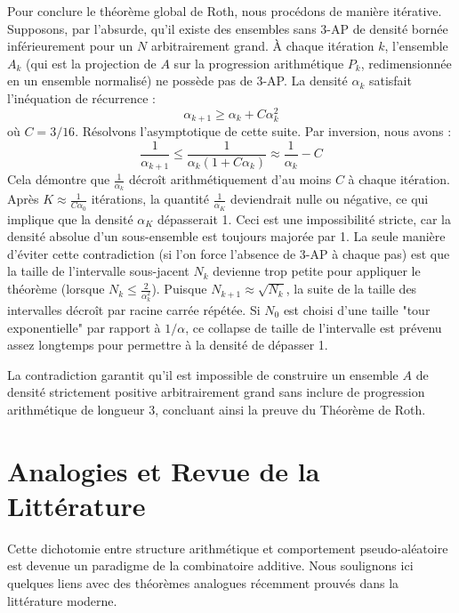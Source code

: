 \documentclass[12pt, a4paper]{article}
\begin{document}
Pour conclure le théorème global de Roth, nous procédons de manière itérative.
Supposons, par l'absurde, qu'il existe des ensembles sans 3-AP de densité bornée inférieurement pour un $N$ arbitrairement grand.
À chaque itération $k$, l'ensemble $A_k$ (qui est la projection de $A$ sur la progression arithmétique $P_k$, redimensionnée en un ensemble normalisé) ne possède pas de 3-AP.
La densité $\alpha_k$ satisfait l'inéquation de récurrence :
\begin{equation}
\alpha_{k+1} \geq \alpha_k + C \alpha_k^2
\end{equation}
où $C = 3/16$.
Résolvons l'asymptotique de cette suite. Par inversion, nous avons :
\begin{equation}
\frac{1}{\alpha_{k+1}} \leq \frac{1}{\alpha_k(1 + C\alpha_k)} \approx \frac{1}{\alpha_k} - C
\end{equation}
Cela démontre que $\frac{1}{\alpha_k}$ décroît arithmétiquement d'au moins $C$ à chaque itération.
Après $K \approx \frac{1}{C \alpha_0}$ itérations, la quantité $\frac{1}{\alpha_K}$ deviendrait nulle ou négative, ce qui implique que la densité $\alpha_K$ dépasserait 1.
Ceci est une impossibilité stricte, car la densité absolue d'un sous-ensemble est toujours majorée par 1.
La seule manière d'éviter cette contradiction (si l'on force l'absence de 3-AP à chaque pas) est que la taille de l'intervalle sous-jacent $N_k$ devienne trop petite pour appliquer le théorème (lorsque $N_k \leq \frac{2}{\alpha_k^2}$).
Puisque $N_{k+1} \approx \sqrt{N_k}$, la suite de la taille des intervalles décroît par racine carrée répétée. Si $N_0$ est choisi d'une taille "tour exponentielle" par rapport à $1/\alpha$, ce collapse de taille de l'intervalle est prévenu assez longtemps pour permettre à la densité de dépasser 1.

La contradiction garantit qu'il est impossible de construire un ensemble $A$ de densité strictement positive arbitrairement grand sans inclure de progression arithmétique de longueur 3, concluant ainsi la preuve du Théorème de Roth.

\section{Analogies et Revue de la Littérature}

Cette dichotomie entre structure arithmétique et comportement pseudo-aléatoire est devenue un paradigme de la combinatoire additive.
Nous soulignons ici quelques liens avec des théorèmes analogues récemment prouvés dans la littérature moderne.
\end{document}
